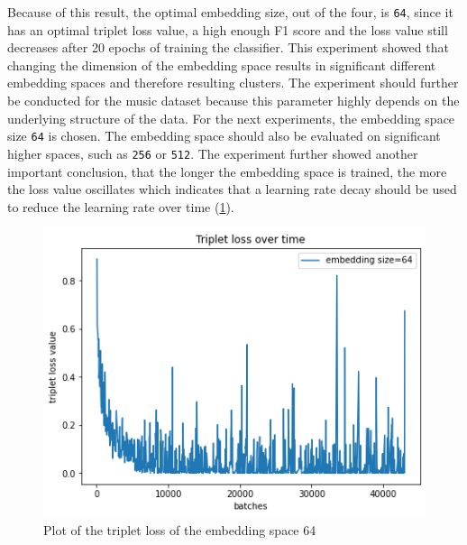 \newline
\newline
\noindent
Because of this result, the optimal embedding size, out of the four, is \texttt{64}, since it has an optimal triplet loss value, a high enough F1 score and the loss value still decreases after 20 epochs of training the classifier.
\newline
\newline
This experiment showed that changing the dimension of the embedding space results in significant different embedding spaces and therefore resulting clusters. The experiment should further be conducted for the music dataset because this parameter highly depends on the underlying structure of the data. 
\newline
\newline
For the next experiments, the embedding space size \texttt{64} is chosen. The embedding space should also be evaluated on significant higher spaces, such as \texttt{256} or \texttt{512}.
\newline
\newline
The experiment further showed another important conclusion, that the longer the embedding space is trained, the more the loss value oscillates which indicates that a learning rate decay should be used to reduce the learning rate over time (\ref{fig:plot-triplet-64}).
\begin{figure}[h]
\centering
    \includegraphics[width=0.5\linewidth]{study-doc/experiment_embedding_size/assets/plot_triplet_loss.png}
    \caption{Plot of the triplet loss of the embedding space 64}
    \label{fig:plot-triplet-64}
\end{figure}

